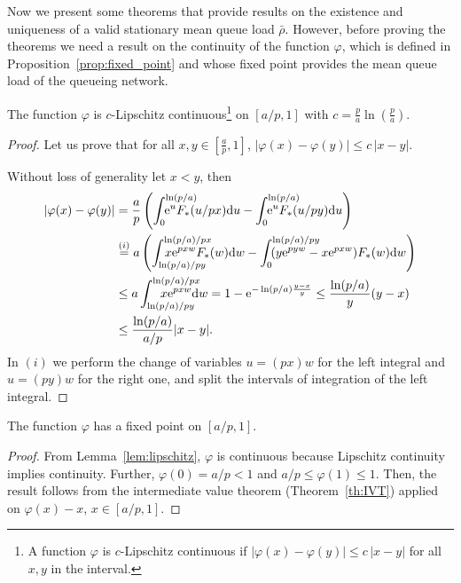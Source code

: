 Now we present some theorems that provide results on the existence and uniqueness of a valid stationary mean queue load $\bar\rho$.
%
However, before proving the theorems we need a result on the continuity of the function $\varphi$, which is defined in Proposition~\ref{prop:fixed_point} and whose fixed point provides the mean queue load of the queueing network.

\begin{lemma} \label{lem:lipschitz}
    The function $\varphi$ is $c$-Lipschitz continuous\footnote{A function $\varphi$ is $c$-Lipschitz continuous if $|\varphi(x)-\varphi(y)|\le c\,|x-y|$ for all $x,y$ in the interval.} on $[a/p,1]$ with $c = \frac{p}{a}\ln(\frac{p}{a})$.
\end{lemma}
%
\begin{proof}
    Let us prove that for all $x,y\in[\frac{a}{p},1]$, $|\varphi(x)-\varphi(y)| \le c\,|x-y|$.

    Without loss of generality let $x < y$, then
    \begin{align*}
        |\varphi(x)-\varphi(y)| &= \frac{a}{p} \left( \int_0^{\ln(p/a)} \hspace{-10mm} \euler^u F_*(u/px) \d u - \int_0^{\ln(p/a)}\hspace{-10mm} \euler^u F_*(u/py) \d u \right)\\
            &\stackrel{(i)}{=} a \left( \int_{\ln(p/a)/py}^{\ln(p/a)/px}\hspace{-14mm} x\euler^{p x w} F_*(w) \d w -  \int_0^{\ln(p/a)/py}\hspace{-14mm} (y\euler^{p y w} - x\euler^{p x w})F_*(w) \d w \right) \\
            &\le a \int_{\ln(p/a)/py}^{\ln(p/a)/px}\hspace{-12mm} x\euler^{p x w} \d w = 1 - \euler^{-\ln(p/a)\frac{y - x}{y}} \le \frac{\ln(p/a)}{y} (y - x) \\
            &\le \frac{\ln(p/a)}{a/p} |x-y|.
    \end{align*}
    In $(i)$ we perform the change of variables $u = (px)w$ for the left integral and $u = (py)w$ for the right one, and split the intervals of integration of the left integral.
\end{proof}

\begin{theorem} \label{th:existence}
    The function $\varphi$ has a fixed point on $[a/p,1]$.
\end{theorem}
\begin{proof}
    From Lemma~\ref{lem:lipschitz}, $\varphi$ is continuous because Lipschitz continuity implies continuity.
    Further, $\varphi(0) = a/p < 1$ and $a/p \le \varphi(1) \le 1$.
    Then, the result follows from the intermediate value theorem (Theorem~\ref{th:IVT}) applied on $\varphi(x)-x$, $x\in[a/p,1]$.
\end{proof}

